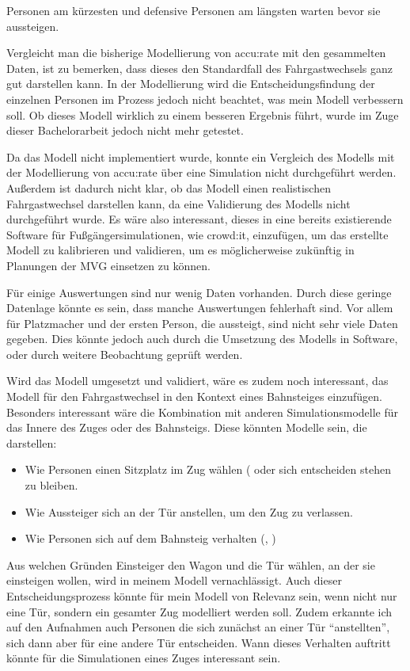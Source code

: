 Personen am kürzesten und defensive Personen am längsten warten bevor sie aussteigen.

Vergleicht man die bisherige Modellierung von accu:rate mit den gesammelten Daten, ist zu bemerken, dass dieses den Standardfall des Fahrgastwechsels ganz gut darstellen kann. In der Modellierung wird die Entscheidungsfindung der einzelnen Personen im Prozess jedoch nicht beachtet, was mein Modell verbessern soll. Ob dieses Modell wirklich zu einem besseren Ergebnis führt, wurde im Zuge dieser Bachelorarbeit jedoch nicht mehr getestet. 

Da das Modell nicht implementiert wurde, konnte ein Vergleich des Modells mit der Modellierung von accu:rate über eine Simulation nicht durchgeführt werden. Außerdem ist dadurch nicht klar, ob das Modell einen realistischen Fahrgastwechsel darstellen kann, da eine Validierung des Modells nicht durchgeführt wurde. Es wäre also interessant, dieses in eine bereits existierende Software für Fuß\-gän\-ger\-si\-mu\-la\-tio\-nen, wie crowd:it, einzufügen, um das erstellte Modell zu kalibrieren und validieren, um es möglicherweise zukünftig in Planungen der MVG einsetzen zu können.

Für einige Auswertungen sind nur wenig Daten vorhanden. Durch diese geringe Datenlage könnte es sein, dass manche Auswertungen fehlerhaft sind. Vor allem für Platzmacher und der ersten Person, die aussteigt, sind nicht sehr viele Daten gegeben. Dies könnte jedoch auch durch die Umsetzung des Modells in Software, oder durch weitere Beobachtung geprüft werden.

Wird das Modell umgesetzt und validiert, wäre es zudem noch interessant, das Modell für den Fahrgastwechsel in den Kontext eines Bahnsteiges einzufügen. Besonders interessant wäre die Kombination mit anderen Simulationsmodelle für das Innere des Zuges oder des Bahnsteigs. Diese könnten Modelle sein, die darstellen:
\begin{itemize}
\item Wie Personen einen Sitzplatz im Zug wählen (\cite{Schottl.2016} oder sich entscheiden stehen zu bleiben.
\item Wie Aussteiger sich an der Tür anstellen, um den Zug zu verlassen.
\item Wie Personen sich auf dem Bahnsteig verhalten (\cite{Davidich.2013}, \cite{Chen.2017})
\end{itemize}

Aus welchen Gründen Einsteiger den Wagon und die Tür wählen, an der sie einsteigen wollen, wird in meinem Modell vernachlässigt. Auch dieser Entscheidungsprozess könnte für mein Modell von Relevanz sein, wenn nicht nur eine Tür, sondern ein gesamter Zug modelliert werden soll. Zudem erkannte ich auf den Aufnahmen auch Personen die sich zunächst an einer Tür "`anstellten"', sich dann aber für eine andere Tür entscheiden. Wann dieses Verhalten auftritt könnte für die Simulationen eines Zuges interessant sein.

